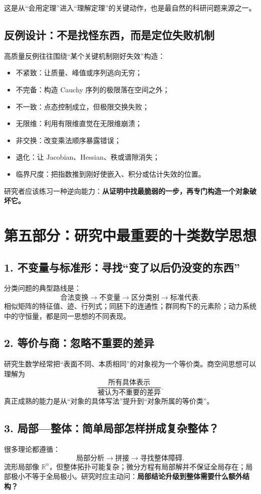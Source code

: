 \documentclass[11pt,a4paper]{ctexart}
\newcommand{\concept}[1]{\textbf{\color{deepblue}#1}}
\newcommand{\R}{\mathbb{R}}
\begin{document}
这是从“会用定理”进入“理解定理”的关键动作，也是最自然的科研问题来源之一。

\subsection{反例设计：不是找怪东西，而是定位失败机制}

高质量反例往往围绕“某个关键机制刚好失效”构造：
\begin{itemize}
  \item 不紧致：让质量、峰值或序列逃向无穷；
  \item 不完备：构造 Cauchy 序列的极限落在空间之外；
  \item 不一致：点态控制成立，但极限交换失败；
  \item 无限维：利用有限维直觉在无限维崩溃；
  \item 非交换：改变乘法顺序暴露错误；
  \item 退化：让 Jacobian、Hessian、秩或谱隙消失；
  \item 临界尺度：把指数推到刚好使嵌入、积分或估计失效的位置。
\end{itemize}

研究者应该练习一种逆向能力：\concept{从证明中找最脆弱的一步，再专门构造一个对象破坏它。}

\section{第五部分：研究中最重要的十类数学思想}

\subsection{1. 不变量与标准形：寻找“变了以后仍没变的东西”}
分类问题的典型路线是：
\[
\text{合法变换}\to\text{不变量}\to\text{区分类别}\to\text{标准代表}.
\]
相似矩阵的特征值、迹、行列式；同胚下的连通性；群同构下的元素阶；动力系统中的守恒量，都是同一思想的不同表现。

\subsection{2. 等价与商：忽略不重要的差异}
研究生数学经常把“表面不同、本质相同”的对象视为一个等价类。商空间思想可以理解为
\[
\frac{\text{所有具体表示}}{\text{被认为不重要的差异}}.
\]
真正成熟的能力是从“对象的具体写法”提升到“对象所属的等价类”。

\subsection{3. 局部—整体：简单局部怎样拼成复杂整体？}
很多理论都遵循：
\[
\text{局部分析}\to\text{拼接}\to\text{寻找整体障碍}.
\]
流形局部像 $\R^n$，但整体拓扑可能复杂；微分方程有局部解并不保证全局存在；局部极小不等于全局极小。研究时应主动问：\textbf{局部结论升级到整体需要什么额外结构？}
\end{document}
